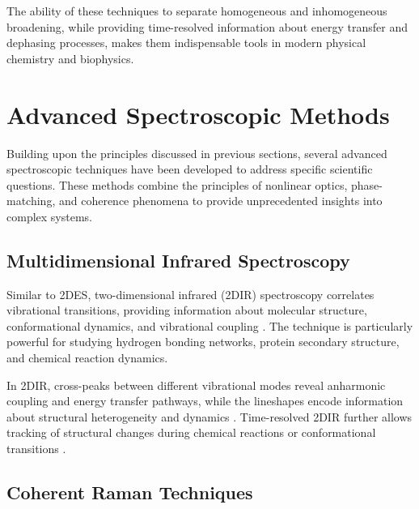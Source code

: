 \noindent The ability of these techniques to separate homogeneous and inhomogeneous broadening, while providing time-resolved information about energy transfer and dephasing processes, makes them indispensable tools in modern physical chemistry and biophysics.


\section{Advanced Spectroscopic Methods}
\label{sec:advanced_methods}

\noindent Building upon the principles discussed in previous sections, several advanced spectroscopic techniques have been developed to address specific scientific questions. These methods combine the principles of nonlinear optics, phase-matching, and coherence phenomena to provide unprecedented insights into complex systems.

\subsection{Multidimensional Infrared Spectroscopy}
\label{subsec:2dir}

\noindent Similar to 2DES, two-dimensional infrared (2DIR) spectroscopy correlates vibrational transitions, providing information about molecular structure, conformational dynamics, and vibrational coupling \cite{hammzanni2011conceptsmethods2d, khaliletal2004vibrationalcoherencetransfer}. The technique is particularly powerful for studying hydrogen bonding networks, protein secondary structure, and chemical reaction dynamics.

\noindent In 2DIR, cross-peaks between different vibrational modes reveal anharmonic coupling and energy transfer pathways, while the lineshapes encode information about structural heterogeneity and dynamics \cite{khaliletal2004vibrationalcoherencetransfer}. Time-resolved 2DIR further allows tracking of structural changes during chemical reactions or conformational transitions \cite{fayer2009dynamicsliquidsmolecules}.

\subsection{Coherent Raman Techniques}
\label{subsec:coherent_raman}

